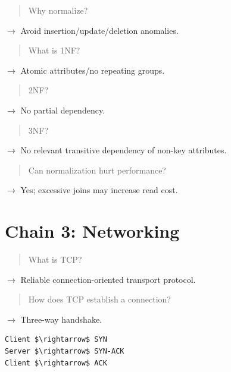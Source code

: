 \begin{quote}
Why normalize?\\
\end{quote}

$\rightarrow$ Avoid insertion/update/deletion anomalies.

\begin{quote}
What is 1NF?\\
\end{quote}

$\rightarrow$ Atomic attributes/no repeating groups.

\begin{quote}
2NF?\\
\end{quote}

$\rightarrow$ No partial dependency.

\begin{quote}
3NF?\\
\end{quote}

$\rightarrow$ No relevant transitive dependency of non-key attributes.

\begin{quote}
Can normalization hurt performance?\\
\end{quote}

$\rightarrow$ Yes; excessive joins may increase read cost.

\medskip

\section{Chain 3: Networking}

\begin{quote}
What is TCP?\\
\end{quote}

$\rightarrow$ Reliable connection-oriented transport protocol.

\begin{quote}
How does TCP establish a connection?\\
\end{quote}

$\rightarrow$ Three-way handshake.

\begin{lstlisting}
Client $\rightarrow$ SYN
Server $\rightarrow$ SYN-ACK
Client $\rightarrow$ ACK
\end{lstlisting}


